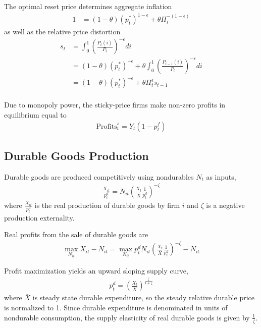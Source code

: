 \documentclass[11pt]{article}
\begin{document}
The optimal reset price determines aggregate inflation
\begin{align*}
	1 &= (1-\theta)(p_{t}^*)^{1-\epsilon} + \theta \Pi_{t}^{-(1-\epsilon)} %
\end{align*}
as well as the relative price distortion
\begin{align*}
	s_t &= \int_0^1 \left(\frac{P_{t}(i)}{P_t}\right)^{-\epsilon}di \\
	&= (1-\theta)(p_t^*)^{-\epsilon} + \theta \int_0^1   \left(\frac{P_{t-1}(i)}{P_t}\right)^{-\epsilon}di \\
	&=(1-\theta)(p_t^*)^{-\epsilon} + \theta \Pi_t^{\epsilon} s_{t-1} \\
\end{align*}

Due to monopoly power, the sticky-price firms make non-zero profits in equilibrium equal to 
\begin{align*}
	\text{Profits}_t^s = Y_t(1-p_t^f)
\end{align*}

\subsection{Durable Goods Production}

Durable goods are produced competitively using nondurables $N_t$ as inputs,
\begin{align*}
    \frac{X_{it}}{p_t^d} = N_{it} \left(\frac{X_{t}}{\bar{X}}\frac{1}{p_t^d}\right)^{-\zeta}
\end{align*}
where $\frac{X_{it}}{p_t^d}$ is the real production of durable goods by firm $i$ and $\zeta$ is a negative production externality.

Real profits from the sale of durable goods are
\begin{align*}
    \max_{N_{it}}X_{it} - N_{it} = \max_{N_{it}} p_t^d N_{it} \left(\frac{X_{t}}{\bar{X}}\frac{1}{p_t^d}\right)^{-\zeta} - N_{it}
\end{align*}

Profit maximization yields an upward sloping supply curve,
\begin{align*}
    p_t^d = \left(\frac{X_t}{\bar{X}}\right)^{\frac{\zeta}{1+\zeta}}
\end{align*}
where $\bar{X}$ is steady state durable expenditure, so the steady relative durable price is normalized to 1. Since durable expenditure is denominated in units of nondurable consumption, the supply elasticity of real durable goods is given by $\frac{1}{\zeta}$.
\end{document}
